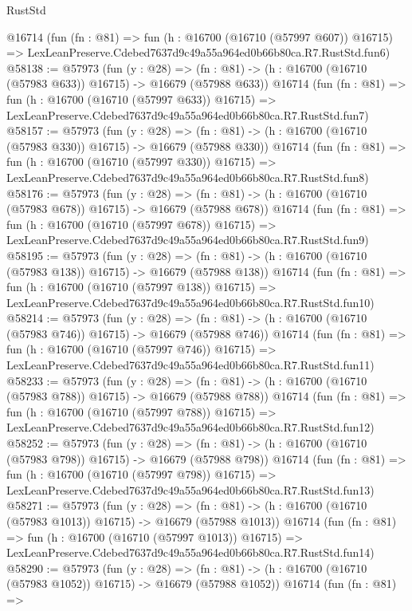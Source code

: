 \begin{lexlean}{RustStd}
\begin{coremodule}
    @16714
    (fun (fn : @81) =>
    fun (h : @16700 (@16710 (@57997 @607)) @16715) =>
    LexLeanPreserve.Cdebed7637d9c49a55a964ed0b66b80ca.R7.RustStd.fun6)
@58138 := @57973
    (fun (y : @28) =>
    (fn : @81) -> (h : @16700 (@16710 (@57983 @633)) @16715) -> @16679 (@57988 @633))
    @16714
    (fun (fn : @81) =>
    fun (h : @16700 (@16710 (@57997 @633)) @16715) =>
    LexLeanPreserve.Cdebed7637d9c49a55a964ed0b66b80ca.R7.RustStd.fun7)
@58157 := @57973
    (fun (y : @28) =>
    (fn : @81) -> (h : @16700 (@16710 (@57983 @330)) @16715) -> @16679 (@57988 @330))
    @16714
    (fun (fn : @81) =>
    fun (h : @16700 (@16710 (@57997 @330)) @16715) =>
    LexLeanPreserve.Cdebed7637d9c49a55a964ed0b66b80ca.R7.RustStd.fun8)
@58176 := @57973
    (fun (y : @28) =>
    (fn : @81) -> (h : @16700 (@16710 (@57983 @678)) @16715) -> @16679 (@57988 @678))
    @16714
    (fun (fn : @81) =>
    fun (h : @16700 (@16710 (@57997 @678)) @16715) =>
    LexLeanPreserve.Cdebed7637d9c49a55a964ed0b66b80ca.R7.RustStd.fun9)
@58195 := @57973
    (fun (y : @28) =>
    (fn : @81) -> (h : @16700 (@16710 (@57983 @138)) @16715) -> @16679 (@57988 @138))
    @16714
    (fun (fn : @81) =>
    fun (h : @16700 (@16710 (@57997 @138)) @16715) =>
    LexLeanPreserve.Cdebed7637d9c49a55a964ed0b66b80ca.R7.RustStd.fun10)
@58214 := @57973
    (fun (y : @28) =>
    (fn : @81) -> (h : @16700 (@16710 (@57983 @746)) @16715) -> @16679 (@57988 @746))
    @16714
    (fun (fn : @81) =>
    fun (h : @16700 (@16710 (@57997 @746)) @16715) =>
    LexLeanPreserve.Cdebed7637d9c49a55a964ed0b66b80ca.R7.RustStd.fun11)
@58233 := @57973
    (fun (y : @28) =>
    (fn : @81) -> (h : @16700 (@16710 (@57983 @788)) @16715) -> @16679 (@57988 @788))
    @16714
    (fun (fn : @81) =>
    fun (h : @16700 (@16710 (@57997 @788)) @16715) =>
    LexLeanPreserve.Cdebed7637d9c49a55a964ed0b66b80ca.R7.RustStd.fun12)
@58252 := @57973
    (fun (y : @28) =>
    (fn : @81) -> (h : @16700 (@16710 (@57983 @798)) @16715) -> @16679 (@57988 @798))
    @16714
    (fun (fn : @81) =>
    fun (h : @16700 (@16710 (@57997 @798)) @16715) =>
    LexLeanPreserve.Cdebed7637d9c49a55a964ed0b66b80ca.R7.RustStd.fun13)
@58271 := @57973
    (fun (y : @28) =>
    (fn : @81) -> (h : @16700 (@16710 (@57983 @1013)) @16715) -> @16679 (@57988 @1013))
    @16714
    (fun (fn : @81) =>
    fun (h : @16700 (@16710 (@57997 @1013)) @16715) =>
    LexLeanPreserve.Cdebed7637d9c49a55a964ed0b66b80ca.R7.RustStd.fun14)
@58290 := @57973
    (fun (y : @28) =>
    (fn : @81) -> (h : @16700 (@16710 (@57983 @1052)) @16715) -> @16679 (@57988 @1052))
    @16714
    (fun (fn : @81) =>

\end{coremodule}
\end{lexlean}
